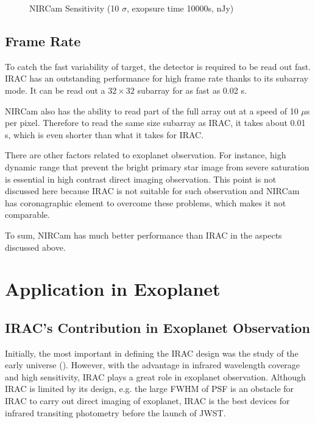 \documentclass[preprint, 12pt]{aastex}
\begin{document}
\begin{figure}
  \centering
  \caption{NIRCam Sensitivity (10 $\sigma$, exopsure time 10000s,
    nJy)}
  \label{fig:nircam-sen}
\end{figure}

\subsection{Frame Rate}
To catch the fast variability of target, the detector is required to
be read out fast. IRAC has an outstanding  performance for high frame
rate thanks to its subarray mode. It can be read out a $32 \times 32$
subarray for as fast as 0.02 s.

NIRCam also has the ability to read  part of the full array out at a
speed of 10 $\mu$s per pixel. Therefore to read the same size subarray
as IRAC, it takes about 0.01 s, which is even shorter than what it
takes for IRAC.

There are other factors related to exoplanet observation. For
instance, high dynamic range that prevent the bright primary star
image from severe saturation is essential in high contrast direct
imaging observation. This point is not discussed here because IRAC is
not suitable for such observation and NIRCam has coronagraphic element
to overcome these problems, which makes it not comparable.

To sum, NIRCam has much better performance than IRAC in the aspects discussed
above.

\section{Application in Exoplanet}
\subsection{IRAC's Contribution in Exoplanet Observation}
Initially, the most important in defining the IRAC design was the
study of the early universe (\citep{2004ApJS..154...10F}). However, with the
advantage in infrared wavelength coverage and high sensitivity, IRAC
plays a great role in exoplanet observation. Although IRAC is limited
by its design, e.g. the large FWHM of PSF is an obstacle for IRAC to
carry out direct imaging of exoplanet, IRAC is the best devices for
infrared transiting photometry before the launch of JWST. \par
\end{document}
